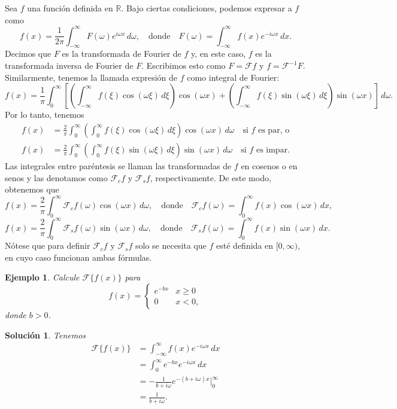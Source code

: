 \documentclass[11pt,letterpaper]{report}
\newtheorem{example}[defn]{Ejemplo}
\newtheorem*{sol}{Solución}
\newcommand\R{\mathbb R}
\newcommand\<{\langle}
\renewcommand\>{\rangle}
\let\cal\mathcal
\begin{document}
Sea $f$ una función definida en $\R$.
Bajo ciertas condiciones, podemos expresar a $f$ como
\[
  f(x)
  =
  \frac{1}{2\pi}\int_{-\infty}^{\infty}
  F(\omega)e^{i\omega x}\,d\omega,
  \quad
  \text{donde}
  \quad
  F(\omega)
  = \int_{-\infty}^{\infty}f(x)e^{-i\omega x}\,dx
.\]
Decimos que $F$ es la transformada de Fourier de $f$ y, en este caso,
$f$ es la transformada inversa de Fourier de $F$. Escribimos esto como
$F=\cal Ff$ y $f=\cal F^{-1}F$.
Similarmente, tenemos la llamada expresión de $f$ como integral de
Fourier:
\[
  f(x)=
  \frac{1}{\pi}
  \int_{0}^{\infty}
  \left[
    \left(
    \int_{-\infty}^{\infty}f(\xi)\cos(\omega\xi)\,d\xi
    \right)
    \cos(\omega x)
    +
    \left(
      \int_{-\infty}^{\infty}f(\xi)\sin(\omega\xi)\,d\xi
    \right)
    \sin(\omega x)
  \right]
  \,d\omega
.\]
Por lo tanto, tenemos
\begin{align*}
  f(x)
  &=
  \frac{2}{\pi}
  \int_{0}^{\infty}
    \left(
    \int_{0}^{\infty}f(\xi)\cos(\omega\xi)\,d\xi
    \right)
    \cos(\omega x)
  \,d\omega
  \quad
  \text{si $f$ es par, o} \\
  f(x)
  &=
  \frac{2}{\pi}
  \int_{0}^{\infty}
    \left(
      \int_{0}^{\infty}f(\xi)\sin(\omega\xi)\,d\xi
    \right)
    \sin(\omega x)
  \,d\omega
  \quad
  \text{si $f$ es impar.}
\end{align*}
Las integrales entre paréntesis se llaman las transformadas de $f$ en
cosenos o en senos y las denotamos como $\cal F_cf$ y $\cal F_sf$,
respectivamente. De este modo, obtenemos que
\[
  f(x)
  =
  \frac{2}{\pi}
  \int_{0}^{\infty}\cal F_cf(\omega)\cos(\omega x)\,d\omega,
  \quad
  \text{donde}
  \quad
  \cal F_cf(\omega)
  =
  \int_{0}^{\infty}f(x)\cos(\omega x)\,dx
,\]
\[
  f(x)
  =
  \frac{2}{\pi}
  \int_{0}^{\infty}\cal F_sf(\omega)\sin(\omega x)\,d\omega,
  \quad
  \text{donde}
  \quad
  \cal F_sf(\omega)
  =
  \int_{0}^{\infty}f(x)\sin(\omega x)\,dx
.\]
Nótese que para definir $\cal F_cf$ y $\cal F_sf$ solo se necesita que
$f$ esté definida en $[0,\infty)$, en cuyo caso funcionan ambas
fórmulas.

\begin{example}
  Calcule $\cal F\{f(x)\}$ para
  \[
    f(x)=
    \begin{cases}
      e^{-bx} & x\geq 0 \\
      0 & x<0,
    \end{cases}
  \]
  donde $b>0$.
\end{example}
\begin{sol}
  Tenemos
  \begin{align*}
    \cal F\{f(x)\}
    &= \int_{-\infty}^{\infty}f(x)e^{-i\omega x}\,dx \\
    &= \int_{0}^{\infty}e^{-bx}e^{-i\omega x}\,dx \\
    &= -\frac{1}{b+i\omega}e^{-(b+i\omega)x}\Big|_{0}^{\infty} \\
    &= \frac{1}{b+i\omega}.
  \end{align*}
\end{sol}
\end{document}
